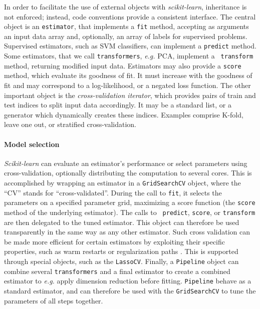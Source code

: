 \documentclass[twoside,11pt]{article}
\begin{document}
%
In order to facilitate the use of external objects with \emph{scikit-learn},
inheritance is not enforced; instead, code
conventions provide a consistent interface.
The central object is an {\tt estimator}, that implements a
{\tt fit} method, accepting as arguments an input data array and,
optionally, an array of labels for supervised problems. Supervised estimators,
such as SVM classifiers, can implement a {\tt predict} method. Some estimators,
that we call {\tt transformers}, \emph{e.g.} PCA, implement a {\tt
transform} method, returning modified input data.
%
Estimators may also provide a {\tt score} method, which evaluate its
goodness of fit. It must increase with the goodness of fit and
may correspond to a log-likelihood, or a negated loss function.
%
The other important object is the \emph{cross-validation iterator},
which provides pairs of train and test indices to split input
data accordingly. It may be a standard list, or a generator
which dynamically
creates these indices.
Examples comprise K-fold,
leave one out, or
stratified cross-validation.


\paragraph{Model selection}
%
\emph{Scikit-learn} can evaluate an estimator's performance or select
parameters using cross-validation, optionally distributing the
computation to several cores.
This is accomplished by wrapping an estimator in a {\tt GridSearchCV}
object, where the ``CV'' stands for ``cross-validated''.
During the call to {\tt fit}, it selects the parameters
on a specified parameter grid, maximizing a score function
(the {\tt score} method of the underlying estimator). The calls to {\tt
predict}, {\tt score}, or {\tt transform} are then delegated to the tuned
estimator. This object can therefore be used transparently in the same
way as any other
estimator.
Such cross validation can be made more efficient for certain
estimators by exploiting their specific properties, such as warm restarts
or regularization paths \citep{friedman2010}. This is supported through special
objects, such as the {\tt LassoCV}.
%
Finally, a {\tt Pipeline} object can
combine several {\tt transformers} and a final estimator to create a
combined estimator to \emph{e.g.} apply dimension reduction before
fitting. {\tt Pipeline} behave as a standard estimator, and can
therefore be used
with the {\tt GridSearchCV} to tune the parameters of all steps together.
\end{document}
